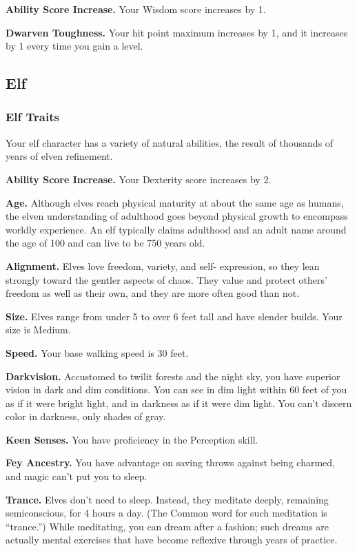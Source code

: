 \textbf{Ability Score Increase.} Your Wisdom score increases by 1.

\textbf{Dwarven Toughness.} Your hit point maximum increases by 1, and
it increases by 1 every time you gain a level.

\hypertarget{elf}{%
\subsection{Elf}\label{elf}}

\hypertarget{elf-traits}{%
\subsubsection{Elf Traits}\label{elf-traits}}

Your elf character has a variety of natural abilities, the result of
thousands of years of elven refinement.

\textbf{Ability Score Increase.} Your Dexterity score increases by 2.

\textbf{Age.} Although elves reach physical maturity at about the same
age as humans, the elven understanding of adulthood goes beyond physical
growth to encompass worldly experience. An elf typically claims
adulthood and an adult name around the age of 100 and can live to be 750
years old.

\textbf{Alignment.} Elves love freedom, variety, and self- expression,
so they lean strongly toward the gentler aspects of chaos. They value
and protect others' freedom as well as their own, and they are more
often good than not.

\textbf{Size.} Elves range from under 5 to over 6 feet tall and have
slender builds. Your size is Medium.

\textbf{Speed.} Your base walking speed is 30 feet.

\textbf{Darkvision.} Accustomed to twilit forests and the night sky, you
have superior vision in dark and dim conditions. You can see in dim
light within 60 feet of you as if it were bright light, and in darkness
as if it were dim light. You can't discern color in darkness, only
shades of gray.

\textbf{Keen Senses.} You have proficiency in the Perception skill.

\textbf{Fey Ancestry.} You have advantage on saving throws against being
charmed, and magic can't put you to sleep.

\textbf{Trance.} Elves don't need to sleep. Instead, they meditate
deeply, remaining semiconscious, for 4 hours a day. (The Common word for
such meditation is ``trance.'') While meditating, you can dream after a
fashion; such dreams are actually mental exercises that have become
reflexive through years of practice.

